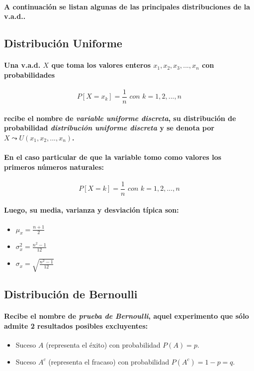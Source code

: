 \paragraph{
A continuación se listan algunas de las principales distribuciones de la v.a.d..
}


\subsection{Distribución Uniforme}
\paragraph{
Una v.a.d. $X$ que toma los valores enteros $x_1,x_2,x_3,...,x_n$ con probabilidades
}
\begin{equation}
P[X = x_k] = \frac{1}{n} \textit{ con } k = 1,2,...,n
\end{equation}
\paragraph{
recibe el nombre de \emph{variable uniforme discreta}, su distribución de probabilidad \emph{distribución uniforme discreta} y se denota por $X \leadsto U(x_1,x_2,...,x_n)$.
}
\paragraph{
En el caso particular de que la variable tomo como valores los primeros números naturales:
}
\begin{equation}
P[X = k] = \frac{1}{n} \textit{ con } k = 1,2,...,n
\end{equation}
\paragraph{
Luego, su media, varianza y desviación típica son:
}
\begin{itemize}
\item $\mu_x =  \displaystyle\frac{n+1}{2}$
\item $\sigma_x^2 = \displaystyle\frac{n^2 -1}{12}$
\item $\sigma_x = \sqrt{\displaystyle\frac{n^2 - 1}{12}}$
\end{itemize}


\subsection{Distribución de Bernoulli}
\paragraph{
Recibe el nombre de \emph{prueba de Bernoulli}, aquel experimento que sólo admite 2 resultados posibles excluyentes:
}
\begin{itemize}
\item Suceso $A$ (representa el éxito) con probabilidad $P(A) = p$.
\item Suceso $A^c$ (representa el fracaso) con probabilidad $P(A^c) = 1 - p = q$.
\end{itemize}
